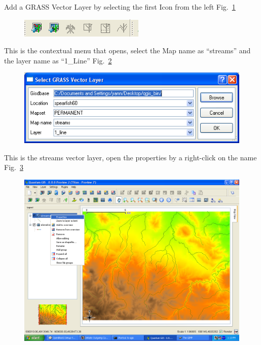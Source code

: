 Add a GRASS Vector Layer by selecting the first Icon from the left Fig.~\ref{fig:qgis019}

\begin{figure}[htbp]
   \centering
   \includegraphics[scale=0.75]{qgis019.png}
   \caption{}
   \label{fig:qgis019}
\end{figure}

This is the contextual menu that opens, select the Map name as
``streams'' and the layer name as ``1\_Line'' Fig.~\ref{fig:qgis020}

\begin{figure}[htbp]
   \centering
   \includegraphics[scale=0.45]{qgis020.png}
   \caption{}
   \label{fig:qgis020}
\end{figure}

This is the streams vector layer, open the properties by a right{}-click
on the name Fig.~\ref{fig:qgis021}

\begin{figure}[htbp]
   \centering
   \includegraphics[scale=0.2]{qgis021.png}
   \caption{}
   \label{fig:qgis021}
\end{figure}

